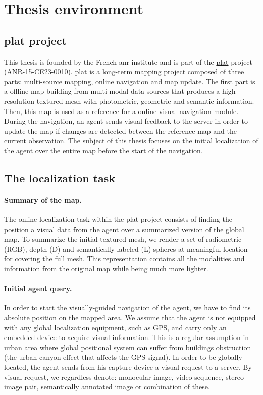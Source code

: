 \section{Thesis environment}
\label{sec:thesis_env}

\subsection{\acs*{plat} project}
\label{subsec:platinum}
This thesis is founded by the French \Ac{anr} institute and is part of the \href{http://platinum.projets.litislab.fr/}{\ac{plat}} project (ANR-15-CE23-0010). \Ac{plat} is a long-term mapping project composed of three parts: multi-source mapping, online navigation and map update. The first part is a offline map-building from multi-modal data sources that produces a high resolution textured mesh with photometric, geometric and semantic information. Then, this map is used as a reference for a online visual navigation module. During the navigation, an agent sends visual feedback to the server in order to update the map if changes are detected between the reference map and the current observation. The subject of this thesis focuses on the initial localization of the agent over the entire map before the start of the navigation.

\subsection{The localization task}
\paragraph{Summary of the map.}
The online localization task within the \ac{plat} project consists of finding the position a visual data from the agent over a summarized version of the global map. To summarize the initial textured mesh, we render a set of radiometric (RGB), depth (D) and semantically labeled (L) spheres at meaningful location for covering the full mesh. This representation contains all the modalities and information from the original map while being much more lighter.

\paragraph{Initial agent query.}
In order to start the visually-guided navigation of the agent, we have to find its absolute position on the mapped area. We assume that the agent is not equipped with any global localization equipment, such as GPS, and carry only an embedded device to acquire visual information. This is a regular assumption in urban area where global positional system can suffer from buildings obstruction (\eg the urban canyon effect that affects the GPS signal). In order to be globally located, the agent sends from his capture device a visual request to a server. By visual request, we regardless denote: monocular image, video sequence, stereo image pair, semantically annotated image or combination of these.


